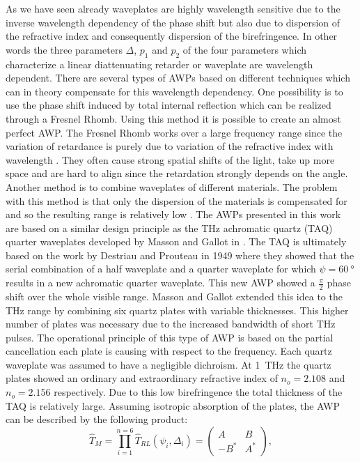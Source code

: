 As we have seen already waveplates are highly wavelength sensitive due to the inverse wavelength dependency of the phase shift but also due to dispersion of the refractive index and consequently dispersion of the birefringence. In other words the three parameters $\Delta$, $p_1$ and $p_2$ of the four parameters which characterize a linear diattenuating retarder or waveplate are wavelength dependent. There are several types of AWPs based on different techniques which can in theory compensate for this wavelength dependency. One possibility is to use the phase shift induced by total internal reflection which can be realized through a Fresnel Rhomb. Using this method it is possible to create an almost perfect AWP. The Fresnel Rhomb works over a large frequency range since the variation of retardance is purely due to variation of the refractive index with wavelength \cite{HechtOpticsEdition}. They often cause strong spatial shifts of the light, take up more space and are hard to align since the retardation strongly depends on the angle. Another method is to combine waveplates of different materials. The problem with this method is that only the dispersion of the materials is compensated for and so the resulting range is relatively low \cite{Masson2006TerahertzJean-Baptiste}. The AWPs presented in this work are based on a similar design principle as the THz achromatic quartz (TAQ) quarter waveplates developed by Masson and Gallot in \cite{Masson2006TerahertzJean-Baptiste}. The TAQ is ultimately based on the work by Destriau and Prouteau in 1949 \cite{Destriau1949RealisationNature} where they showed that the serial combination of a half waveplate and a quarter waveplate for which $\psi=\SI{60}{\degree}$ results in a new achromatic quarter waveplate. This new AWP showed a $\frac{\pi}{2}$ phase shift over the whole visible range. Masson and Gallot extended this idea to the THz range by combining six quartz plates with variable thicknesses. This higher number of plates was necessary due to the increased bandwidth of short THz pulses. The operational principle of this type of AWP is based on the partial cancellation each plate is causing with respect to the frequency. Each quartz waveplate was assumed to have a negligible dichroism. At \SI{1}{\tera \hertz} the quartz plates showed an ordinary and extraordinary refractive index of $n_o=2.108$ and $n_o=2.156$ respectively. Due to this low birefringence the total thickness of the TAQ is relatively large. Assuming isotropic absorption of the plates, the AWP can be described by the following product:
\begin{equation}
    \hat{T}_{M} = \prod_{i=1}^{n=6} \hat{T}_{RL}(\psi_i, \Delta_i) = 
    \begin{pmatrix} 
    A & B \\
    -B^* & A^*
    \end{pmatrix},
\end{equation}

